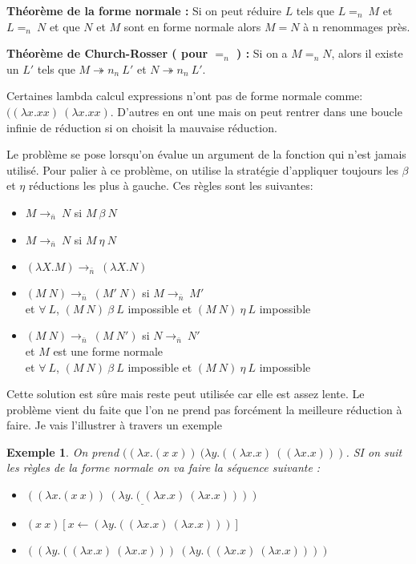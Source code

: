 \documentclass[10pt,a4paper]{report}
\newtheorem{ex}{Exemple}
\begin{document}
\textbf{Théorème de la forme normale :}
Si on peut réduire $L$ tels que $L =_{n}~M$ et $L =_{n}~N$ et que $N$ et $M$ sont en forme normale alors $M = N$ à n renommages près.
\medbreak	

\textbf{Théorème de Church-Rosser ( pour $=_{n}$ ) :}
Si on a $M =_{n} N$, alors il existe un $L'$ tels que $M \twoheadrightarrow n_{n}~L'$ et $N \twoheadrightarrow n_{n}~L'$.
\medbreak

Certaines lambda calcul expressions n'ont pas de forme normale comme: $((\lambda x.x x)~(\lambda x.x x)$. 
D'autres en ont une mais on peut rentrer dans une boucle infinie de réduction si on choisit la mauvaise réduction.
\medbreak

Le problème se pose lorsqu'on évalue un argument de la fonction qui n'est jamais utilisé. Pour palier à ce problème, on utilise la stratégie d'appliquer toujours les $\beta$ et $\eta$ réductions les plus à gauche. Ces règles sont les suivantes:
\begin{itemize}
\item[-] $M \longrightarrow_{\bar{n}}~N$ si $M~\beta~N$
\item[-] $M \longrightarrow_{\bar{n}}~N$ si $M~\eta~N$
\item[-] $(\lambda X.M) \longrightarrow_{\bar{n}}~(\lambda X.N)$
\item[-] $(M~N) \longrightarrow_{\bar{n}}~(M'~N)$ si $M \longrightarrow_{\bar{n}}~M'$
  \\ et $\forall~L$, $(M~N)~\beta~L$ impossible et $(M~N)~\eta~L$ impossible
\item[-] $(M~N) \longrightarrow_{\bar{n}}~(M~N')$ si $N \longrightarrow_{\bar{n}}~N'$
  \\ et $M$ est une forme normale
  \\ et  $\forall~L$, $(M~N)~\beta~L$ impossible et $(M~N)~\eta~L$ impossible
\end{itemize}
\smallbreak
Cette solution est sûre mais reste peut utilisée car elle est assez lente. Le problème vient du faite que l'on ne prend pas forcément la meilleure réduction à faire. Je vais l'illustrer à travers un exemple
\begin{ex}
	On prend $((\lambda x.(x~x))~(\lambda y.((\lambda x.x)~((\lambda x.x)))$. SI on suit les règles de la forme normale on va faire la séquence suivante :
	\begin{itemize}
		\item[] $\underline{((\lambda x.(x~x))~(\lambda y.((\lambda x.x)~(\lambda x.x))))}$
		\item[$\rightarrow_{n}^{\beta}$] $(x~x)[x \leftarrow (\lambda y.((\lambda x.x)~(\lambda x.x)))]$
		\item[] $((\lambda y.((\lambda x.x)~(\lambda x.x)))~(\lambda y.((\lambda x.x)~(\lambda x.x))))$
	\end{itemize}
\end{ex}
\medbreak
\end{document}
